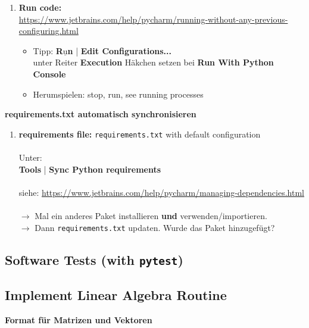\begin{enumerate}
		\item \textbf{Run code:}\\ \url{https://www.jetbrains.com/help/pycharm/running-without-any-previous-configuring.html}
		\begin{itemize}
			\item Tipp: \textbf{R$\underline{\text{u}}$n} | \textbf{Edit Configurations...} \\
			unter Reiter \textbf{Execution} Häkchen setzen bei \textbf{Run With Python Console}
			\item Herumspielen: stop, run, see running processes
		\end{itemize}
	\end{enumerate}



		\textbf{requirements.txt automatisch synchronisieren}

	\begin{enumerate}
		\item \textbf{requirements file:} \texttt{requirements.txt} with default configuration\\~\\
		Unter:\\
		\textbf{Tools} | \textbf{Sync Python requirements}~\\
		~\\
		siehe: \url{https://www.jetbrains.com/help/pycharm/managing-dependencies.html}\\~\\
		$\to$ Mal ein anderes Paket installieren \textbf{und} verwenden/importieren.\\
		$\to$ Dann \texttt{requirements.txt} updaten. Wurde das Paket hinzugefügt?
	\end{enumerate}






\subsection{Software Tests (with \texttt{pytest})}

\subsection{Implement Linear Algebra Routine}



		\textbf{ Format für Matrizen und Vektoren}\\


